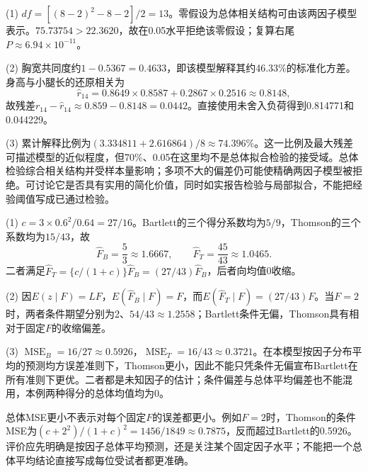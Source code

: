 (1) $df=[(8-2)^2-8-2]/2=13$。零假设为总体相关结构可由该两因子模型表示。$75.73754>22.3620$，故在0.05水平拒绝该零假设；复算右尾$P\approx6.94\times10^{-11}$。\par (2) 胸宽共同度约$1-0.5367=0.4633$，即该模型解释其约46.33\%的标准化方差。身高与小腿长的还原相关为\[\widehat r_{14}=0.8649\times0.8587+0.2867\times0.2516\approx0.8148,\]故残差$r_{14}-\widehat r_{14}\approx0.859-0.8148=0.0442$。直接使用未舍入负荷得到0.814771和0.044229。\par (3) 累计解释比例为$(3.334811+2.616864)/8\approx74.396\%$。这一比例及最大残差可描述模型的近似程度，但70\%、0.05在这里均不是总体拟合检验的接受域。总体检验综合相关结构并受样本量影响；多项不大的偏差仍可能使精确两因子模型被拒绝。可讨论它是否具有实用的简化价值，同时如实报告检验与局部拟合，不能把经验阈值写成已通过检验。
\par\nobreak\smallskip{}

(1) $c=3\times0.6^2/0.64=27/16$。Bartlett的三个得分系数均为$5/9$，Thomson的三个系数均为$15/43$，故\[\widehat F_B=\frac53\approx1.6667,\qquad \widehat F_T=\frac{45}{43}\approx1.0465.\]二者满足$\widehat F_T=\{c/(1+c)\}\widehat F_B=(27/43)\widehat F_B$，后者向均值0收缩。\par (2) 因$E(z\mid F)=LF$，$E(\widehat F_B\mid F)=F$，而$E(\widehat F_T\mid F)=(27/43)F$。当$F=2$时，两者条件期望分别为2、$54/43\approx1.2558$；Bartlett条件无偏，Thomson具有相对于固定$F$的收缩偏差。\par (3) $\operatorname{MSE}_B=16/27\approx0.5926$，$\operatorname{MSE}_T=16/43\approx0.3721$。在本模型按因子分布平均的预测均方误差准则下，Thomson更小，因此不能只凭条件无偏宣布Bartlett在所有准则下更优。二者都是未知因子的估计；条件偏差与总体平均偏差也不能混用，本例两种得分的总体均值均为0。\par 总体MSE更小不表示对每个固定$F$的误差都更小。例如$F=2$时，Thomson的条件MSE为$(c+2^2)/(1+c)^2=1456/1849\approx0.7875$，反而超过Bartlett的0.5926。评价应先明确是按因子总体平均预测，还是关注某个固定因子水平；不能把一个总体平均结论直接写成每位受试者都更准确。
\par\nobreak\smallskip{}

